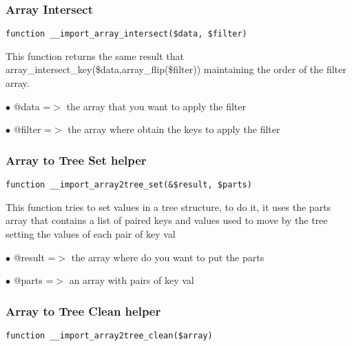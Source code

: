 \documentclass[a4paper]{article}
\begin{document}
\hypertarget{toc474}{}
\subsubsection{Array Intersect}

\begin{lstlisting}
function __import_array_intersect($data, $filter)
\end{lstlisting}

This function returns the same result that array\_intersect\_key(\$data,array\_flip(\$filter))
maintaining the order of the filter array.

\begin{compactitem}
\item[\color{myblue}$\bullet$] @data   =$>$ the array that you want to apply the filter
\item[\color{myblue}$\bullet$] @filter =$>$ the array where obtain the keys to apply the filter
\end{compactitem}

\hypertarget{toc475}{}
\subsubsection{Array to Tree Set helper}

\begin{lstlisting}
function __import_array2tree_set(&$result, $parts)
\end{lstlisting}

This function tries to set values in a tree structure, to do it, it uses
the parts array that contains a list of paired keys and values used to move
by the tree setting the values of each pair of key val

\begin{compactitem}
\item[\color{myblue}$\bullet$] @result =$>$ the array where do you want to put the parts
\item[\color{myblue}$\bullet$] @parts  =$>$ an array with pairs of key val
\end{compactitem}

\hypertarget{toc476}{}
\subsubsection{Array to Tree Clean helper}

\begin{lstlisting}
function __import_array2tree_clean($array)
\end{lstlisting}
\end{document}
